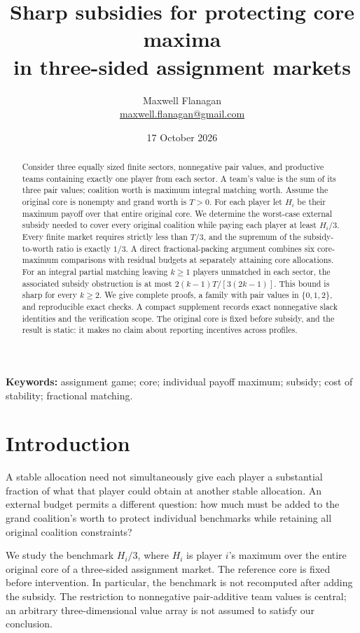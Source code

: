 \documentclass[11pt]{article}
\title{Sharp subsidies for protecting core maxima\\in three-sided assignment markets}
\author{Maxwell Flanagan\\\small\href{mailto:maxwell.flanagan@gmail.com}{maxwell.flanagan@gmail.com}}
\date{17 October 2026}
\theoremstyle{remark}
\begin{document}
\maketitle

\begin{abstract}
Consider three equally sized finite sectors, nonnegative pair values, and
productive teams containing exactly one player from each sector. A team's
value is the sum of its three pair values; coalition worth is maximum integral
matching worth. Assume the original core is nonempty and grand worth is
$T>0$. For each player let $H_i$ be their maximum payoff over that entire
original core. We determine the worst-case external subsidy needed to cover
every original coalition while paying each player at least $H_i/3$.
Every finite market requires strictly less than $T/3$, and the supremum of
the subsidy-to-worth ratio is exactly $1/3$. A direct fractional-packing
argument combines six core-maximum comparisons with residual budgets at
separately attaining core allocations. For an integral partial matching
leaving $k\ge1$ players unmatched in each sector, the associated subsidy
obstruction is at most $2(k-1)T/[3(2k-1)]$. This bound is sharp for every
$k\ge2$. We give complete proofs, a family with pair values in
$\{0,1,2\}$, and reproducible exact checks. A compact supplement records exact nonnegative slack identities and the
verification scope. The original core is fixed before subsidy, and the result
is static: it makes no claim about reporting incentives across profiles.
\end{abstract}
\noindent\textbf{Keywords:} assignment game; core; individual payoff maximum;
subsidy; cost of stability; fractional matching.

\section{Introduction}
A stable allocation need not simultaneously give each player a substantial
fraction of what that player could obtain at another stable allocation.
An external budget permits a different question: how much must be added to
the grand coalition's worth to protect individual benchmarks while retaining
all original coalition constraints?

We study the benchmark $H_i/3$, where $H_i$ is player $i$'s maximum over the
entire original core of a three-sided assignment market. The reference core
is fixed before intervention. In particular, the benchmark is not recomputed
after adding the subsidy. The restriction to nonnegative pair-additive team
values is central; an arbitrary three-dimensional value array is not assumed
to satisfy our conclusion.
\end{document}
